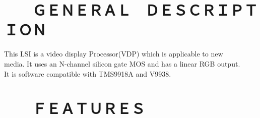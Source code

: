 \documentclass[a4paper,10pt]{article}
\begin{document}
\newpage

\setcounter{page}{0}

\renewcommand\contentsname{\hskip 6em ＴＡＢＬＥ　ＯＦ　ＣＯＮＴＥＮＴＳ}
\tableofcontents

\newpage

\setcounter{page}{1}
\fancyfoot[C]{\Large \thepage}

\section*{　　ＧＥＮＥＲＡＬ　ＤＥＳＣＲＩＰＴＩＯＮ}

\noindent This LSI is a video display Processor(VDP) which is applicable to new\\
media. It uses an N-channel silicon gate MOS and has a linear RGB output.\\
It is software compatible with TMS9918A and V9938.\\

\section*{　　ＦＥＡＴＵＲＥＳ}
\end{document}
